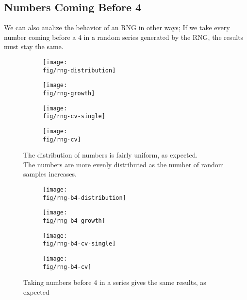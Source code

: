 \documentclass[12pt,a4paper]{article}
\newcommand{\fig}{../fig}
\begin{document}
	\subsection{Numbers Coming Before 4}
	We can also analize the behavior of an RNG in other ways; If we take every number coming before a 4 in a random
	series generated by the RNG, the results must stay the same.
	\thispagestyle{empty}
	\begin{figure}
		\centering
		\begin{subfigure}{0.42\linewidth}
			\centering
			\texttt{[image: \\fig/rng-distribution]}
		\end{subfigure}
		\begin{subfigure}{0.42\linewidth}
			\centering
			\texttt{[image: \\fig/rng-growth]}
		\end{subfigure}
		\par\bigskip
		\begin{subfigure}{0.42\linewidth}
			\centering
			\texttt{[image: \\fig/rng-cv-single]}
		\end{subfigure}
		\begin{subfigure}{0.42\linewidth}
			\centering
			\texttt{[image: \\fig/rng-cv]}
		\end{subfigure}
		\caption{The distribution of numbers is fairly uniform, as expected.\\The numbers are more evenly
				distributed as the number of random samples increases.}
	\end{figure}
	\begin{figure}
		\centering
		\begin{subfigure}{0.42\linewidth}
			\centering
			\texttt{[image: \\fig/rng-b4-distribution]}
		\end{subfigure}
		\begin{subfigure}{0.42\linewidth}
			\centering
			\texttt{[image: \\fig/rng-b4-growth]}
		\end{subfigure}
		\par\bigskip
		\begin{subfigure}{0.42\linewidth}
			\centering
			\texttt{[image: \\fig/rng-b4-cv-single]}
		\end{subfigure}
		\begin{subfigure}{0.42\linewidth}
			\centering
			\texttt{[image: \\fig/rng-b4-cv]}
		\end{subfigure}
		\caption{Taking numbers before 4 in a series gives the same results, as expected}
	\end{figure}
	\restoregeometry
\end{document}
